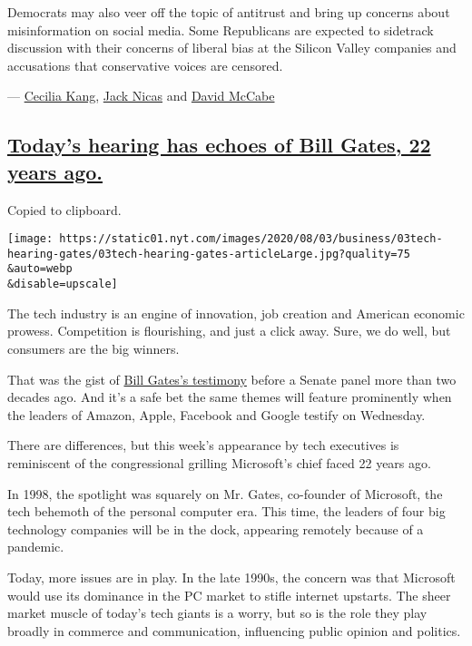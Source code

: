 Democrats may also veer off the topic of antitrust and bring up concerns
about misinformation on social media. Some Republicans are expected to
sidetrack discussion with their concerns of liberal bias at the Silicon
Valley companies and accusations that conservative voices are censored.

--- \href{https://www.nytimes.com/by/cecilia-kang}{Cecilia Kang},
\href{https://www.nytimes.com/by/jack-nicas}{Jack Nicas} and
\href{https://www.nytimes.com/by/david-mccabe}{David McCabe}

\hypertarget{todays-hearing-has-echoes-of-bill-gates-22-years-ago}{%
\subsection{\texorpdfstring{\protect\hyperlink{todays-hearing-has-echoes-of-bill-gates-22-years-ago}{Today's
hearing has echoes of Bill Gates, 22 years
ago.}}{Today's hearing has echoes of Bill Gates, 22 years ago.}}\label{todays-hearing-has-echoes-of-bill-gates-22-years-ago}}

Copied to clipboard.

\texttt{[image: https://static01.nyt.com/images/2020/08/03/business/03tech-hearing-gates/03tech-hearing-gates-articleLarge.jpg?quality=75\\\&auto=webp\\\&disable=upscale]}

The tech industry is an engine of innovation, job creation and American
economic prowess. Competition is flourishing, and just a click away.
Sure, we do well, but consumers are the big winners.

That was the gist of
\href{https://archive.nytimes.com/www.nytimes.com/library/tech/98/03/biztech/articles/04microsoft.html}{Bill
Gates's testimony} before a Senate panel more than two decades ago. And
it's a safe bet the same themes will feature prominently when the
leaders of Amazon, Apple, Facebook and Google testify on Wednesday.

There are differences, but this week's appearance by tech executives is
reminiscent of the congressional grilling Microsoft's chief faced 22
years ago.

In 1998, the spotlight was squarely on Mr. Gates, co-founder of
Microsoft, the tech behemoth of the personal computer era. This time,
the leaders of four big technology companies will be in the dock,
appearing remotely because of a pandemic.

Today, more issues are in play. In the late 1990s, the concern was that
Microsoft would use its dominance in the PC market to stifle internet
upstarts. The sheer market muscle of today's tech giants is a worry, but
so is the role they play broadly in commerce and communication,
influencing public opinion and politics.

